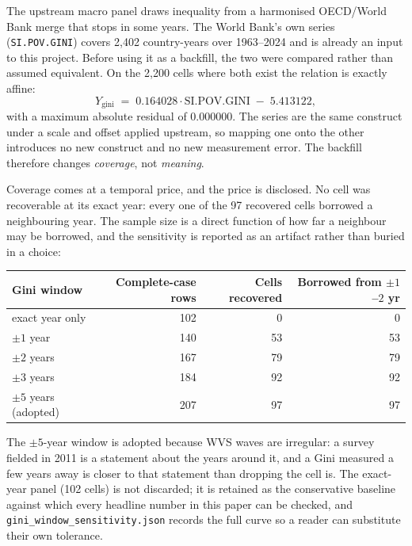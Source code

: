 \documentclass[11pt]{article}
\begin{document}
The upstream macro panel draws inequality from a harmonised OECD/World Bank
merge that stops in some years. The World Bank's own series
(\texttt{SI.POV.GINI}) covers 2{,}402 country-years over 1963--2024 and is
already an input to this project. Before using it as a backfill, the two were
compared rather than assumed equivalent. On the 2{,}200 cells where both exist
the relation is exactly affine:
\[
Y_{\text{gini}} \;=\; \num{0.164028}\cdot \text{SI.POV.GINI} \;-\; \num{5.413122},
\]
with a maximum absolute residual of \num{0.000000}. The series are the same
construct under a scale and offset applied upstream, so mapping one onto the
other introduces no new construct and no new measurement error. The backfill
therefore changes \emph{coverage}, not \emph{meaning}.

Coverage comes at a temporal price, and the price is disclosed. No cell was
recoverable at its exact year: every one of the \num{97} recovered cells borrowed a
neighbouring year. The sample size is a direct function of how far a neighbour
may be borrowed, and the sensitivity is reported as an artifact rather than
buried in a choice:

\begin{center}
\begin{tabular}{@{}lrrr@{}}
\toprule
Gini window & Complete-case rows & Cells recovered & Borrowed from $\pm1$--$2$ yr \\
\midrule
exact year only & 102 & 0 & 0 \\
$\pm 1$ year & 140 & 53 & 53 \\
$\pm 2$ years & 167 & 79 & 79 \\
$\pm 3$ years & 184 & 92 & 92 \\
$\pm 5$ years (adopted) & 207 & 97 & 97 \\
\bottomrule
\end{tabular}
\end{center}

The $\pm 5$-year window is adopted because WVS waves are irregular: a survey
fielded in 2011 is a statement about the years around it, and a Gini measured a
few years away is closer to that statement than dropping the cell is. The exact-year
panel (102 cells) is not discarded; it is retained as the conservative baseline
against which every headline number in this paper can be checked, and
\texttt{gini\_window\_sensitivity.json} records the full curve so a reader can
substitute their own tolerance.
\end{document}

